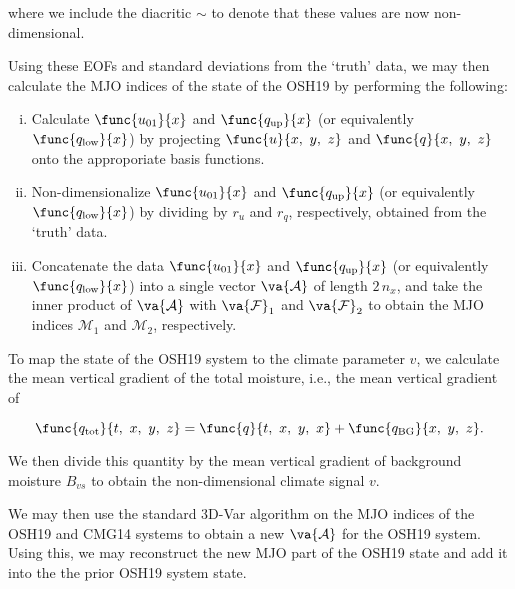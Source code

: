 where we include the diacritic $\sim$ to denote that these values are now non-dimensional. 

Using these EOFs and standard deviations from the `truth' data, we may then calculate the MJO indices of the state of the OSH19 by performing the following:
\begin{enumerate}[(i)]
	\item Calculate $\func{u_{01}}{x}$ and $\func{q_{\text{up}}}{x}$ (or equivalently $\func{q_{\text{low}}}{x}$) by projecting $\func{u}{x,\ y,\ z}$ and $\func{q}{x,\ y,\ z}$ onto the approporiate basis functions.
	\item Non-dimensionalize $\func{u_{01}}{x}$ and $\func{q_{\text{up}}}{x}$ (or equivalently $\func{q_{\text{low}}}{x}$) by dividing by $r_u$ and $r_q$, respectively, obtained from the `truth' data.
	\item Concatenate the data $\func{u_{01}}{x}$ and $\func{q_{\text{up}}}{x}$ (or equivalently $\func{q_{\text{low}}}{x}$) into a single vector $\va{\mathcal{A}}$ of length $2\,n_x$, and take the inner product of $\va{\mathcal{A}}$ with $\va{\mathcal{F}}_1$ and $\va{\mathcal{F}}_2$ to obtain the MJO indices $\mathcal{M}_1$ and $\mathcal{M}_2$, respectively.
\end{enumerate}

To map the state of the OSH19 system to the climate parameter $v$, we calculate the mean vertical gradient of the total moisture, i.e., the mean vertical gradient of 

\begin{equation}
	\func{q_{\text{tot}}}{t,\ x,\ y,\ z} = \func{q}{t,\ x,\ y,\ x} + \func{q_{\text{BG}}}{x,\ y,\ z}.
\end{equation}

We then divide this quantity by the mean vertical gradient of background moisture $B_{vs}$ to obtain the non-dimensional climate signal $v$.

We may then use the standard 3D-Var algorithm on the MJO indices of the OSH19 and CMG14 systems to obtain a new $\va{\mathcal{A}}$ for the OSH19 system. Using this, we may reconstruct the new MJO part of the OSH19 state and add it into the the prior OSH19 system state.